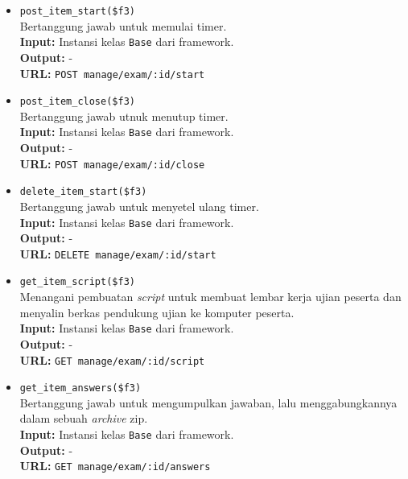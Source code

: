\begin{itemize}
\begin{itemize}
                \item \texttt{post\_item\_start(\$f3)} \\
                    Bertanggung jawab untuk memulai timer.\\
                    \textbf{Input:} Instansi kelas \texttt{Base} dari framework.\\
                    \textbf{Output:} -\\
                    \textbf{URL:} \texttt{POST manage/exam/:id/start}
                
                \item \texttt{post\_item\_close(\$f3)} \\
                    Bertanggung jawab utnuk menutup timer.\\
                    \textbf{Input:} Instansi kelas \texttt{Base} dari framework.\\
                    \textbf{Output:} -\\
                    \textbf{URL:} \texttt{POST manage/exam/:id/close}
                
                \item \texttt{delete\_item\_start(\$f3)} \\
                    Bertanggung jawab untuk menyetel ulang timer.\\
                    \textbf{Input:} Instansi kelas \texttt{Base} dari framework.\\
                    \textbf{Output:} -\\
                    \textbf{URL:} \texttt{DELETE manage/exam/:id/start}
                
                \item \texttt{get\_item\_script(\$f3)} \\
                    Menangani pembuatan \textit{script} untuk membuat lembar kerja ujian
                    peserta dan menyalin berkas pendukung ujian ke komputer peserta.\\
                    \textbf{Input:} Instansi kelas \texttt{Base} dari framework.\\
                    \textbf{Output:} -\\
                    \textbf{URL:} \texttt{GET manage/exam/:id/script}
                    
                \item \texttt{get\_item\_answers(\$f3)} \\
                    Bertanggung jawab untuk mengumpulkan jawaban, lalu menggabungkannya
                    dalam sebuah \textit{archive} zip.\\
                    \textbf{Input:} Instansi kelas \texttt{Base} dari framework.\\
                    \textbf{Output:} -\\
                    \textbf{URL:} \texttt{GET manage/exam/:id/answers}
                

\end{itemize}
\end{itemize}
